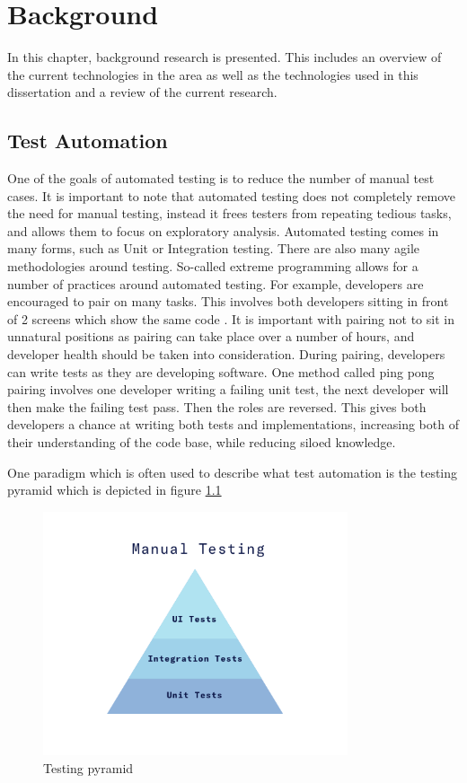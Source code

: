 \chapter{Background}

In this chapter, background research is presented. This includes an overview of the current technologies in the area as well as the technologies used in this dissertation and a review of the current research.

\section{Test Automation}

One of the goals of automated testing is to reduce the number of manual test cases. It is important to note that automated testing does not completely remove the need for manual testing, instead it frees testers from repeating tedious tasks, and allows them to focus on exploratory analysis. Automated testing comes in many forms, such as Unit or Integration testing. There are also many agile methodologies around testing. So-called extreme programming allows for a number of practices around automated testing. For example, developers are encouraged to pair on many tasks. This involves both developers sitting in front of 2 screens which show the same code \cite{6901641}. It is important  with pairing not to sit in unnatural positions as pairing can take place over a number of hours, and developer health should be taken into consideration. During pairing, developers can write tests as they are developing software. One method called ping pong pairing involves one developer writing a failing unit test, the next developer will then make the failing test pass. Then the roles are reversed. This gives both developers a chance at writing both tests and implementations, increasing both of their understanding of the code base, while reducing siloed knowledge. 

One paradigm which is often used to describe what test automation is the testing pyramid which is depicted in figure \ref{fig:testing-pyramid}

\begin{figure}[!h]
  \centering
    \includegraphics[width=0.8\textwidth]{figures/testing-pyramid.png}
    \caption{Testing pyramid}
    \label{fig:testing-pyramid}
\end{figure}

